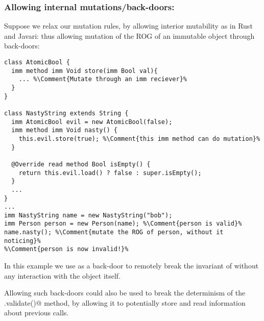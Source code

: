 \subsubsection*{Allowing internal mutations/back-doors:}
Suppose we relax our mutation rules, by allowing interior mutability
as in Rust and Javari: thus allowing mutation of the ROG of an immutable object through back-doors:
\begin{lstlisting}[escapechar=\%]
class AtomicBool {
  imm method imm Void store(imm Bool val){
    ... %\Comment{Mutate through an imm reciever}%
  }
}

class NastyString extends String {
  imm AtomicBool evil = new AtomicBool(false);
  imm method imm Void nasty() {
    this.evil.store(true); %\Comment{this imm method can do mutation}%
  }

  @Override read method Bool isEmpty() {
    return this.evil.load() ? false : super.isEmpty();
  }
  ...
}
...
imm NastyString name = new NastyString("bob");
imm Person person = new Person(name); %\Comment{person is valid}%
name.nasty(); %\Comment{mutate the ROG of person, without it noticing}%
%\Comment{person is now invalid!}%
\end{lstlisting}

In this example we use \Q@AtomicBool@ as a back-door to remotely break the invariant of \Q@person@ without any interaction with the \Q@person@ object itself.


Allowing such back-doors could also be used to break the determinism of the \Q@.validate()@ method, by allowing it to potentially store and read information about previous calls.


